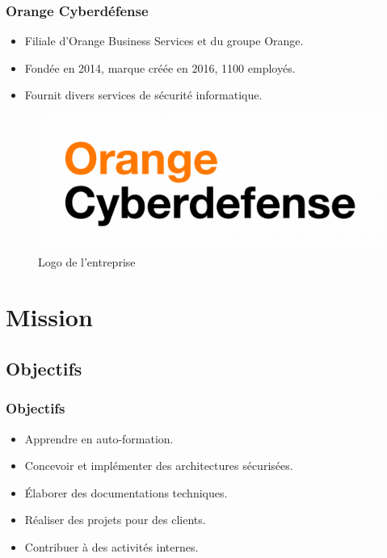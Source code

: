 \documentclass[french, a4paper]{beamer}
\begin{document}
\begin{frame}
    \frametitle{Orange Cyberdéfense}
    \begin{minipage}{0.5\textwidth}
        \begin{itemize}
            \item Filiale d'Orange Business Services et du groupe Orange.
            \item Fondée en 2014, marque créée en 2016, 1100 employés.
            \item Fournit divers services de sécurité informatique.
        \end{itemize}
    \end{minipage}%
    \hfill
    \begin{minipage}{0.5\textwidth}
        \begin{figure}[h!]
            \centering
            \includegraphics[width = \linewidth]{img/logo/ocd.png}
            \caption{Logo de l'entreprise}%
            \label{fig:logo/ocd}
        \end{figure}
    \end{minipage}
\end{frame}


\section{Mission}
\subsection{Objectifs}

\begin{frame}
    \frametitle{Objectifs}
    \begin{itemize}
        \item Apprendre en auto-formation.
        \item Concevoir et implémenter des architectures sécurisées.
        \item Élaborer des documentations techniques.
        \item Réaliser des projets pour des clients.
        \item Contribuer à des activités internes.
    \end{itemize}
\end{frame}
\end{document}
